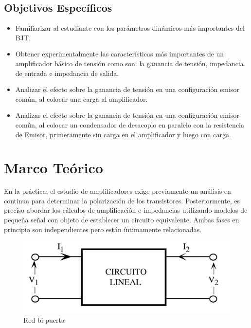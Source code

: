 \documentclass[12pt, a4paper]{article}
\begin{document}
    \subsection{Objetivos Específicos}
    \begin{itemize}
        \item Familiarizar al estudiante con los parámetros dinámicos más importantes del BJT.
        \item Obtener experimentalmente las características más importantes de un amplificador básico de tensión como son: la ganancia de tensión, impedancia de entrada e impedancia de salida.
        \item Analizar el efecto sobre la ganancia de tensión en una configuración emisor común, al colocar una carga al amplificador.
        \item Analizar el efecto sobre la ganancia de tensión en una configuración emisor común, al colocar un condensador de desacoplo en paralelo con la resistencia de Emisor, primeramente sin carga en el amplificador y luego con carga.
    \end{itemize}

    \newpage

    \section{Marco Teórico}

    En la práctica, el estudio de amplificadores exige previamente un análisis en continua para determinar la polarización de los transistores. Posteriormente, es preciso abordar los cálculos de amplificación e impedancias utilizando modelos de pequeña señal con objeto de establecer un circuito equivalente. Ambas fases en principio son independientes pero están íntimamente relacionadas.

    \begin{figure}[h!]
        \centering
        \includegraphics[height=4cm\textwidth]{circuito-lineal.jpg}
        \caption{Red bi-puerta}
        \label{fig:cir-lin}
    \end{figure}
\end{document}

